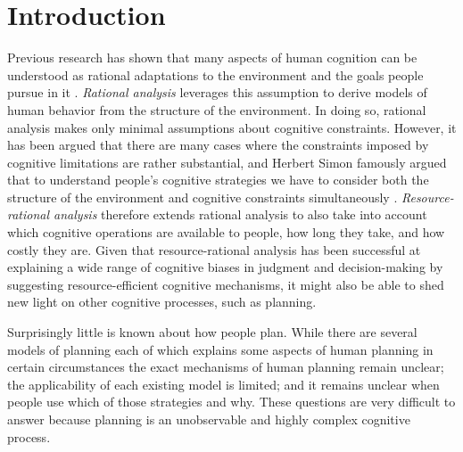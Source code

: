 
\section{Introduction}
\label{sec:introduction}

Previous research has shown that many aspects of human cognition can be understood as rational adaptations to the environment and the goals people pursue in it \citep{Anderson1990,Chater1999}. \textit{Rational analysis} leverages this assumption to derive models of human behavior from the structure of the environment. In doing so, rational analysis makes only minimal assumptions about cognitive constraints. %
However, it has been argued that there are many cases where the constraints imposed by cognitive limitations are rather substantial, and Herbert Simon famously argued that to understand people's cognitive strategies we have to  consider both the structure of the environment and cognitive constraints simultaneously \citep{Simon1956,Simon1982}. \textit{Resource-rational analysis} \citep{GriffithsLiederGoodman2015} therefore extends rational analysis to also take into account which cognitive operations are available to people, how long they take, and how costly they are. Given that resource-rational analysis has been successful at explaining a wide range of cognitive biases in judgment \citep{LiederGriffithsHuysGoodman2017a,LiederGriffithsHuysGoodman2017b} and decision-making \citep{LiederGriffithsHsu2017} by suggesting resource-efficient cognitive mechanisms, it might also be able to shed new light on other cognitive processes, such as planning.

Surprisingly little is known about how people plan. While there are several models of planning \citep{Newell1956,NewellSimon1972a,deGroot1965,Korf1987,Huys2012,Huys2015,Keramati2016} each of which explains some aspects of human planning in certain circumstances the exact mechanisms of human planning remain unclear; the applicability of each existing model is limited; and it remains unclear when people use which of those strategies and why. These questions are very difficult to answer because planning is an unobservable and highly complex cognitive process.

